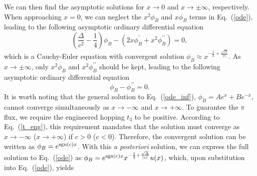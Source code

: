 \documentclass[aps, twocolumn, floatfix, superscriptaddress, prb]{revtex4-1}
\begin{document}
We can then find the asymptotic solutions for $x\rightarrow 0$ and $x\rightarrow \pm\infty$, respectively. When approaching $x=0$, we can neglect the $x^2\phi_B$ and $x\phi_B$ terms in Eq.~(\ref{ode}), leading to the following asymptotic ordinary differential equation
%
\begin{equation}
\left( \frac{\Delta }{c^2 }-\frac{1}{4}\right) \phi_B -\left(2x\phi_B^{\prime } +x^2 \phi_B^{\prime \prime } \right)=0,
\end{equation}
%
which is a Cauchy-Euler equation with convergent solution $\phi_B\approx x^{-\frac12+\frac{\sqrt{\Delta}}{|c|}}$. As $x\rightarrow\pm\infty$, only $x^2\phi_B$ and $x^2 \phi_B^{\prime\prime }$ should be kept, leading to the following asymptotic ordinary differential equation
%
\begin{equation}\label{ode_inf}
\phi_B - \phi_B^{\prime \prime } =0.
\end{equation}
%
It is worth noting that the general solution to Eq.~(\ref{ode_inf}), $\phi_B=Ae^x+Be^{-x}$, cannot converge simultaneously as $x\rightarrow -\infty$ and $x\rightarrow+\infty$. To guarantee the $\pi$ flux, we require the engineered hopping $t_3$ to be positive. According to Eq.~(\ref{t_eng}), this requirement mandates that the solution must converge as {$x\rightarrow -\infty$ ($x\rightarrow +\infty$) if $c>0$ ($c<0$)}. Therefore, the convergent solution can be written as $\phi_B=e^{{\rm sgn}(c) x}$. With this \emph{a posteriori} solution, we can express the full solution to Eq.~(\ref{ode}) as $\phi_B=e^{{\rm sgn}(c) x}x^{-\frac12+\frac{\sqrt{\Delta}}{|c|}}u(x)$, which, upon substitution into Eq.~(\ref{ode}), yields
\end{document}
